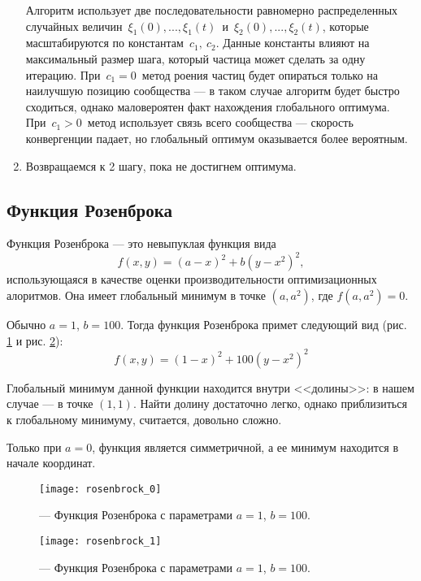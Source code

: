 \begin{enumerate}
	Алгоритм использует две последовательности равномерно распределенных случайных величин~$\xi_1(0), ..., \xi_1(t)$~и~$\xi_2(0), ..., \xi_2(t)$, которые масштабируются по константам~$c_1,\ c_2$. Данные константы влияют на максимальный размер шага, который частица может сделать за одну итерацию.	При~$c_1 = 0$~метод роения частиц будет опираться только на наилучшую позицию сообщества --- в таком случае алгоритм будет быстро сходиться, однако маловероятен факт нахождения глобального оптимума. При~$c_1 > 0$~метод использует связь всего сообщества --- скорость конвергенции падает, но глобальный оптимум оказывается более вероятным.

	\item Возвращаемся к 2 шагу, пока не достигнем оптимума.
\end{enumerate}

\subsection{Функция Розенброка}

\noindent
Функция Розенброка --- это невыпуклая функция вида
\[
	f(x, y) = (a - x)^2 + b(y-x^2)^2,
\]
использующаяся в качестве оценки производительности оптимизационных алоритмов. Она имеет глобальный минимум в точке $(a, a^2)$, где $f(a, a^2) = 0$.

Обычно $a = 1$, $b=100$. Тогда функция Розенброка примет следующий вид (рис. \ref{img:rosenbrock_0} и рис. \ref{img:rosenbrock_1}):
\[
	f(x, y) = (1 - x)^2 + 100(y-x^2)^2
\]

Глобальный минимум данной функции находится внутри <<долины>>: в нашем случае --- в точке $(1, 1)$. Найти долину достаточно легко, однако приблизиться к глобальному минимуму, считается, довольно сложно.

Только при $a = 0$, функция является симметричной, а ее минимум находится в начале координат.

\begin{figure}[ht]
	\centering
  \texttt{[image: rosenbrock\_0]}
  \caption{ --- Функция Розенброка с параметрами $a = 1$, $b = 100$.}
  \label{img:rosenbrock_0}
\end{figure}

\newpage

\begin{figure}[ht]
	\centering
  \texttt{[image: rosenbrock\_1]}
  \caption{ --- Функция Розенброка с параметрами $a = 1$, $b = 100$.}
  \label{img:rosenbrock_1}
\end{figure}


